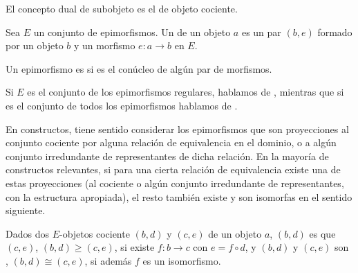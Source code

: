 El concepto dual de subobjeto es el de objeto cociente.

\begin{definition}
  Sea $E$ un conjunto de epimorfismos. Un  de un
  objeto $a$ es un par $(b,e)$ formado por un objeto $b$ y un morfismo
  $e:a\to b$ en $E$.
\end{definition}

\begin{definition}
  Un epimorfismo es  si es el conúcleo de algún par de morfismos.
\end{definition}

Si $E$ es el conjunto de los epimorfismos regulares, hablamos de , mientras que si es el conjunto de todos los epimorfismos
hablamos de .

En constructos, tiene sentido considerar los epimorfismos que son proyecciones
al conjunto cociente por alguna relación de equivalencia en el dominio, o a
algún conjunto irredundante de representantes de dicha relación. En la mayoría
de constructos relevantes, si para una cierta relación de equivalencia existe
una de estas proyecciones (al cociente o algún conjunto irredundante de
representantes, con la estructura apropiada), el resto también existe y son
isomorfas en el sentido siguiente.

\begin{definition}
  Dados dos $E$-objetos cociente $(b,d)$ y $(c,e)$ de un objeto $a$, $(b,d)$ es
   que $(c,e)$, $(b,d)\geq(c,e)$, si existe $f:b\to c$ con
  $e=f\circ d$, y $(b,d)$ y $(c,e)$ son , $(b,d)\cong(c,e)$, si
  además $f$ es un isomorfismo.
\end{definition}

